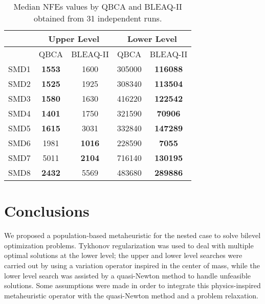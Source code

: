 \documentclass[conference]{IEEEtran}
\theoremstyle{definition}
\begin{document}
\begin{table}[!ht]
    \caption{Median NFEs values by QBCA and BLEAQ-II obtained from 31 independent runs.}
    \label{tab:ul-comparative-fes}
    \centering
    \begin{tabular}{|c|c|c|c|c|}
\hline
& \multicolumn{2}{c|}{Upper Level} & \multicolumn{2}{c|}{Lower Level} \\ \hline
& QBCA & BLEAQ-II & QBCA & BLEAQ-II \\ \hline
SMD1 & \textbf{1553}  & 1600          &  305000 & \textbf{116088} \\ \hline
SMD2 & \textbf{1525}  & 1925          &  308340 & \textbf{113504} \\ \hline
SMD3 & \textbf{1580}  & 1630          &  416220 & \textbf{122542} \\ \hline
SMD4 & \textbf{1401} & 1750  &  321590 & \textbf{70906} \\ \hline
SMD5 & \textbf{1615}  & 3031          &  332840 & \textbf{147289} \\ \hline
SMD6 & 1981 &  \textbf{1016} &   228590& \textbf{7055} \\ \hline
SMD7 & 5011 &  \textbf{2104} & 716140  & \textbf{130195} \\ \hline
SMD8 & \textbf{2432}  & 5569          &  483680 & \textbf{289886} \\ \hline
    \end{tabular}
\end{table}





\section{Conclusions} %
\label{sec:conclusions}


We proposed a population-based metaheuristic for the nested case to solve bilevel
optimization problems. Tykhonov regularization was used to deal with multiple
optimal solutions at the lower level; the upper and lower level searches were
carried out by using a variation operator inspired in the center of mass, while
the lower level search was assisted by a quasi-Newton method to handle unfeasible
solutions. Some assumptions were made in order to integrate this physics-inspired
metaheuristic operator with the quasi-Newton method and a problem relaxation.
\end{document}

